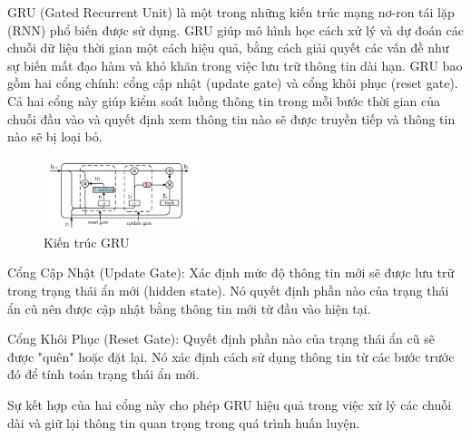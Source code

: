 GRU (Gated Recurrent Unit) là một trong những kiến trúc mạng nơ-ron tái lặp (RNN) phổ biến được sử dụng. GRU giúp mô hình học cách xử lý và dự đoán các chuỗi dữ liệu thời gian một cách hiệu quả, bằng cách giải quyết các vấn đề như sự biến mất đạo hàm và khó khăn trong việc lưu trữ thông tin dài hạn. GRU bao gồm hai cổng chính: cổng cập nhật (update gate) và cổng khôi phục (reset gate). Cả hai cổng này giúp kiểm soát luồng thông tin trong mỗi bước thời gian của chuỗi đầu vào và quyết định xem thông tin nào sẽ được truyền tiếp và thông tin nào sẽ bị loại bỏ.

\begin{figure}[htbp]
\centerline{\includegraphics[width=0.4\textwidth]{img/GRU.png}}
\caption{Kiến trúc GRU}
\label{fig}
\end{figure}

Cổng Cập Nhật (Update Gate): Xác định mức độ thông tin mới sẽ được lưu trữ trong trạng thái ẩn mới (hidden state). Nó quyết định phần nào của trạng thái ẩn cũ nên được cập nhật bằng thông tin mới từ đầu vào hiện tại.

Cổng Khôi Phục (Reset Gate): Quyết định phần nào của trạng thái ẩn cũ sẽ được "quên" hoặc đặt lại. Nó xác định cách sử dụng thông tin từ các bước trước đó để tính toán trạng thái ẩn mới.

Sự kết hợp của hai cổng này cho phép GRU hiệu quả trong việc xử lý các chuỗi dài và giữ lại thông tin quan trọng trong quá trình huấn luyện.